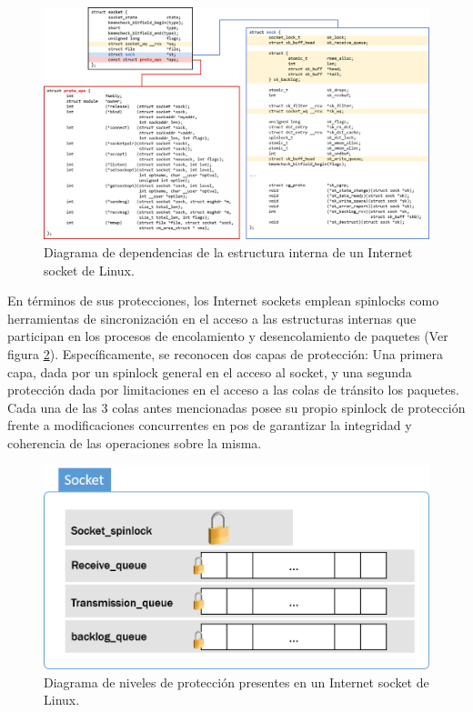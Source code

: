 \begin{figure}[!h]
	\centering
	\includegraphics[scale=0.6]{imagenes/socketStructsDependecy.png}
	\caption{Diagrama de dependencias de la estructura interna de un Internet socket de Linux.}
	\label{fig:socketAnathomy}
\end{figure}

En términos de sus protecciones, los Internet sockets emplean spinlocks como herramientas de sincronización en el acceso a las estructuras internas que participan en los procesos de encolamiento y desencolamiento de paquetes (Ver figura \ref{fig:socketAnathomy2}). Específicamente, se reconocen dos capas de protección: Una primera capa, dada por un spinlock general en el acceso al socket, y una segunda protección dada por limitaciones en el acceso a las colas de tránsito los paquetes. Cada una de las 3 colas antes mencionadas posee su propio spinlock de protección frente a modificaciones concurrentes en pos de garantizar la integridad y coherencia de las operaciones sobre la misma.

\begin{figure}[!h]
	\centering
	\includegraphics[scale=0.6]{imagenes/spinlocksSocket.png}
	\caption{Diagrama de niveles de protección presentes en un Internet socket de Linux.}
	\label{fig:socketAnathomy2}
\end{figure}

